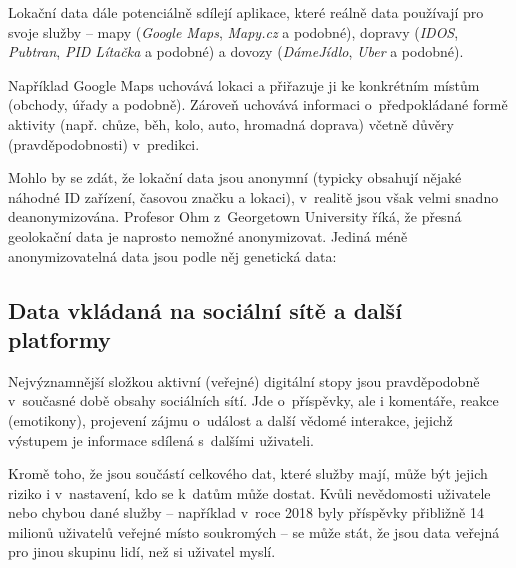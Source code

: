Lokační data dále potenciálně sdílejí aplikace, které reálně data používají pro svoje služby -- mapy (\textit{Google Maps}, \textit{Mapy.cz} a podobné), dopravy (\textit{IDOS}, \textit{Pubtran}, \textit{PID Lítačka} a podobné) a dovozy (\textit{DámeJídlo}, \textit{Uber}  a podobné).

Například Google Maps uchovává lokaci a přiřazuje ji ke konkrétním místům (obchody, úřady a podobně). Zároveň uchovává informaci o~předpokládané formě aktivity (např. chůze, běh, kolo, auto, hromadná doprava) včetně důvěry (pravděpodobnosti) v~predikci.

Mohlo by se zdát, že lokační data jsou anonymní (typicky obsahují nějaké náhodné ID zařízení, časovou značku a lokaci), v~realitě jsou však velmi snadno deanonymizována. Profesor Ohm z~Georgetown University říká, že přesná geolokační data je naprosto nemožné anonymizovat. Jediná méně anonymizovatelná data jsou podle něj genetická data:

\begin{displayquote}
	\citep{location-data}
\end{displayquote}

\subsection{Data vkládaná na sociální sítě a další platformy}
Nejvýznamnější složkou aktivní (veřejné) digitální stopy jsou pravděpodobně v~současné době obsahy sociálních sítí.
Jde o~příspěvky, ale i komentáře, reakce (emotikony), projevení zájmu o~událost a další vědomé interakce, jejichž výstupem je informace sdílená s~dalšími uživateli. 

Kromě toho, že jsou součástí celkového  dat, které služby mají, může být jejich riziko i v~nastavení, kdo se k~datům může dostat.
Kvůli nevědomosti uživatele nebo chybou dané služby -- například v~roce 2018 byly příspěvky přibližně 14 milionů uživatelů veřejné místo soukromých \citep{facebook-public-posts} -- se může stát, že jsou data veřejná pro jinou skupinu lidí, než si uživatel myslí. 

